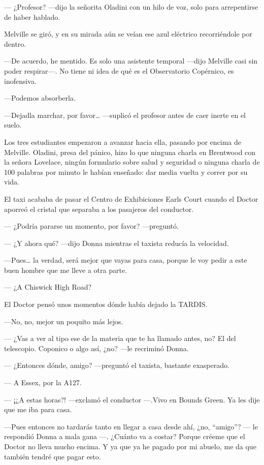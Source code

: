 ---  ¿Profesor? ---dijo la señorita Oladini con un hilo de voz, solo para
arrepentirse de haber hablado.

Melville se giró, y en su mirada aún se veían ese azul eléctrico
recorriéndole por dentro.

---De acuerdo, he mentido. Es solo una asistente temporal ---dijo
Melville casi sin poder respirar---. No tiene ni idea de qué es el
Observatorio Copérnico, es inofensiva.

---Podemos absorberla.

---Dejadla marchar, por favor\ldots{} ---suplicó el profesor antes de
caer inerte en el suelo.

Los tres estudiantes empezaron a avanzar hacia ella, pasando por encima
de Melville. Oladini, presa del pánico, hizo lo que ninguna charla en
Brentwood con la señora Lovelace, ningún formulario sobre salud y
seguridad o ninguna charla de 100 palabras por minuto le habían
enseñado: dar media vuelta y correr por su vida.

El taxi acababa de pasar el Centro de Exhibiciones Earls Court cuando el
Doctor aporreó el cristal que separaba a los pasajeros del conductor.

--- ¿Podría pararse un momento, por favor? ---preguntó.

--- ¿Y ahora qué? ---dijo Donna mientras el taxista reducía la
velocidad.

---Pues\ldots{} la verdad, será mejor que vayas para casa, porque le voy
pedir a este buen hombre que me lleve a otra parte.

--- ¿A Chiswick High Road?

El Doctor pensó unos momentos dónde había dejado la TARDIS.

---No, no, mejor un poquito más lejos.

--- ¿Vas a ver al tipo ese de la materia que te ha llamado antes, no?
El del telescopio.   Coponico o algo así, ¿no? ---le recriminó Donna.

--- ¿Entonces dónde, amigo? ---preguntó el taxista, bastante exasperado.

--- A Essex, por la A127.

---  ¡¿A estas horas?! ---exclamó el conductor ---.Vivo en Bounds Green.
Ya les dije que me iba para casa.

---Pues entonces no tardarás tanto en llegar a casa desde ahí, ¿no,
``amigo''? ---  le respondió Donna a mala gana ---.  ¿Cuánto va a costar?
Porque créeme que el Doctor no lleva mucho encima. Y ya que ya he pagado
por mi abuelo, me da que también tendré que pagar esto.

